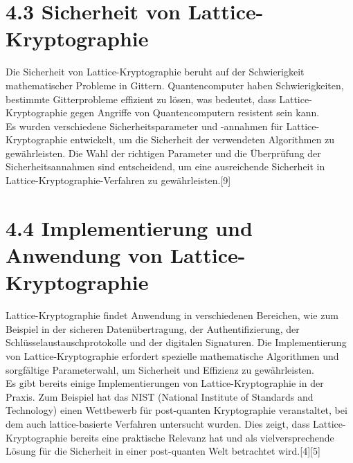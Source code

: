 \section{4.3 Sicherheit von Lattice-Kryptographie}
Die Sicherheit von Lattice-Kryptographie beruht auf der Schwierigkeit mathematischer Probleme in Gittern. Quantencomputer haben Schwierigkeiten, bestimmte Gitterprobleme effizient zu lösen, was bedeutet, dass Lattice-Kryptographie gegen Angriffe von Quantencomputern resistent sein kann.
\\ Es wurden verschiedene Sicherheitsparameter und -annahmen für Lattice-Kryptographie entwickelt, um die Sicherheit der verwendeten Algorithmen zu gewährleisten. Die Wahl der richtigen Parameter und die Überprüfung der Sicherheitsannahmen sind entscheidend, um eine ausreichende Sicherheit in Lattice-Kryptographie-Verfahren zu gewährleisten.[9]

\section{4.4 Implementierung und Anwendung von Lattice-Kryptographie}
Lattice-Kryptographie findet Anwendung in verschiedenen Bereichen, wie zum Beispiel in der sicheren Datenübertragung, der Authentifizierung, der Schlüsselaustauschprotokolle und der digitalen Signaturen. Die Implementierung von Lattice-Kryptographie erfordert spezielle mathematische Algorithmen und sorgfältige Parameterwahl, um Sicherheit und Effizienz zu gewährleisten.
\\ Es gibt bereits einige Implementierungen von Lattice-Kryptographie in der Praxis. Zum Beispiel hat das NIST (National Institute of Standards and Technology) einen Wettbewerb für post-quanten Kryptographie veranstaltet, bei dem auch lattice-basierte Verfahren untersucht wurden. Dies zeigt, dass Lattice-Kryptographie bereits eine praktische Relevanz hat und als vielversprechende Lösung für die Sicherheit in einer post-quanten Welt betrachtet wird.[4][5]
